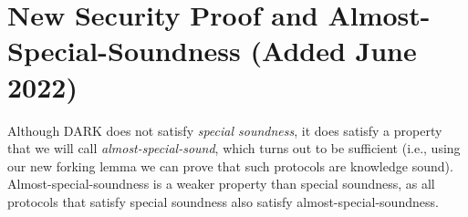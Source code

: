 \clearpage
\section*{New Security Proof and Almost-Special-Soundness (Added June 2022)}

\label{appendix:proofs}

Although DARK does not satisfy \emph{special soundness}, it does satisfy a property that we will call \emph{almost-special-sound}, which turns out to be sufficient (i.e., using our new forking lemma we can prove that such protocols are knowledge sound). Almost-special-soundness is a weaker property than special soundness, as all protocols that satisfy special soundness also satisfy almost-special-soundness. 

